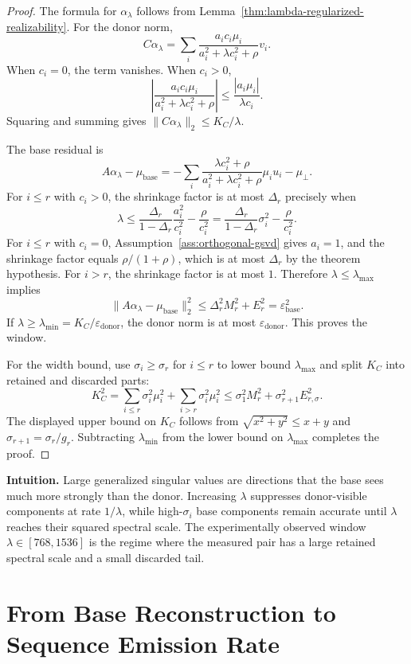 \begin{proof}
The formula for $\alpha_\lambda$ follows from Lemma~\ref{thm:lambda-regularized-realizability}. For the donor norm,
\[
C\alpha_\lambda
=
\sum_i
\frac{a_ic_i\mu_i}{a_i^2+\lambda c_i^2+\rho}v_i.
\]
When $c_i=0$, the term vanishes. When $c_i>0$,
\[
\left|
\frac{a_ic_i\mu_i}{a_i^2+\lambda c_i^2+\rho}
\right|
\le
\frac{|a_i\mu_i|}{\lambda c_i}.
\]
Squaring and summing gives $\|C\alpha_\lambda\|_2\le K_C/\lambda$.

The base residual is
\[
A\alpha_\lambda-\mu_{\text{base}}
=
-
\sum_i
\frac{\lambda c_i^2+\rho}{a_i^2+\lambda c_i^2+\rho}\mu_i u_i
-
\mu_\perp.
\]
For $i\le r$ with $c_i>0$, the shrinkage factor is at most $\Delta_r$ precisely when
\[
\lambda
\le
\frac{\Delta_r}{1-\Delta_r}\frac{a_i^2}{c_i^2}-\frac{\rho}{c_i^2}
=
\frac{\Delta_r}{1-\Delta_r}\sigma_i^2-\frac{\rho}{c_i^2}.
\]
For $i\le r$ with $c_i=0$, Assumption~\ref{ass:orthogonal-gsvd} gives $a_i=1$, and the shrinkage factor equals $\rho/(1+\rho)$, which is at most $\Delta_r$ by the theorem hypothesis. For $i>r$, the shrinkage factor is at most $1$. Therefore $\lambda\le\lambda_{\max}$ implies
\[
\|A\alpha_\lambda-\mu_{\text{base}}\|_2^2
\le
\Delta_r^2M_r^2+E_r^2
=
\varepsilon_{\text{base}}^2.
\]
If $\lambda\ge\lambda_{\min}=K_C/\varepsilon_{\text{donor}}$, the donor norm is at most $\varepsilon_{\text{donor}}$. This proves the window.

For the width bound, use $\sigma_i\ge\sigma_r$ for $i\le r$ to lower bound $\lambda_{\max}$ and split $K_C$ into retained and discarded parts:
\[
K_C^2
=
\sum_{i\le r}\sigma_i^2\mu_i^2+
\sum_{i>r}\sigma_i^2\mu_i^2
\le
\sigma_1^2M_r^2+\sigma_{r+1}^2E_{r,\sigma}^2.
\]
The displayed upper bound on $K_C$ follows from $\sqrt{x^2+y^2}\le x+y$ and $\sigma_{r+1}=\sigma_r/g_r$. Subtracting $\lambda_{\min}$ from the lower bound on $\lambda_{\max}$ completes the proof.
\end{proof}

\noindent\textbf{Intuition.}
Large generalized singular values are directions that the base sees much more strongly than the donor. Increasing $\lambda$ suppresses donor-visible components at rate $1/\lambda$, while high-$\sigma_i$ base components remain accurate until $\lambda$ reaches their squared spectral scale. The experimentally observed window $\lambda\in[768,1536]$ is the regime where the measured pair has a large retained spectral scale and a small discarded tail.

\section{From Base Reconstruction to Sequence Emission Rate}
\label{app:base-reconstruction-to-ser}

